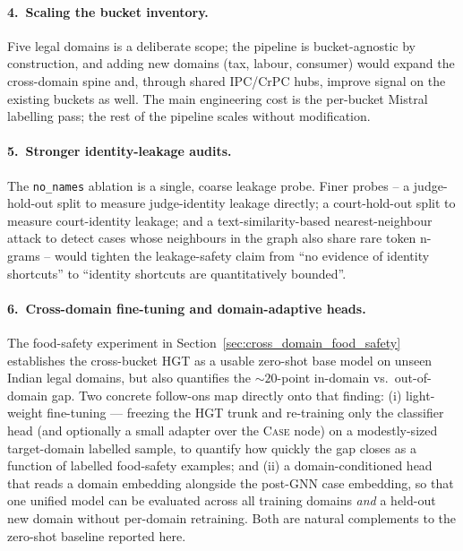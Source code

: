 \paragraph{4.\ Scaling the bucket inventory.} Five legal domains is
a deliberate scope; the pipeline is bucket-agnostic by construction,
and adding new domains (tax, labour, consumer) would expand the
cross-domain spine and, through shared IPC/CrPC hubs, improve signal
on the existing buckets as well. The main engineering cost is the
per-bucket Mistral labelling pass; the rest of the pipeline scales
without modification.

\paragraph{5.\ Stronger identity-leakage audits.} The \texttt{no\_names}
ablation is a single, coarse leakage probe. Finer probes -- a
judge-hold-out split to measure judge-identity leakage directly; a
court-hold-out split to measure court-identity leakage; and a
text-similarity-based nearest-neighbour attack to detect cases whose
neighbours in the graph also share rare token n-grams -- would
tighten the leakage-safety claim from ``no evidence of identity
shortcuts'' to ``identity shortcuts are quantitatively bounded''.

\paragraph{6.\ Cross-domain fine-tuning and domain-adaptive
heads.}  The food-safety experiment in
Section~\ref{sec:cross_domain_food_safety} establishes the
cross-bucket HGT as a usable zero-shot base model on unseen Indian
legal domains, but also quantifies the $\sim\!20$-point in-domain
vs.\ out-of-domain gap.  Two concrete follow-ons map directly onto
that finding: (i) light-weight fine-tuning --- freezing the HGT
trunk and re-training only the classifier head (and optionally a
small adapter over the \textsc{Case} node) on a modestly-sized
target-domain labelled sample, to quantify how quickly the gap
closes as a function of labelled food-safety examples; and
(ii) a domain-conditioned head that reads a domain embedding
alongside the post-GNN case embedding, so that one unified model
can be evaluated across all training domains \emph{and} a held-out
new domain without per-domain retraining.  Both are natural
complements to the zero-shot baseline reported here.

